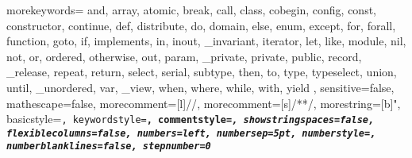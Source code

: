   {
    morekeywords={
      and, array, atomic,
      break,
      call, class, cobegin, config, const, constructor, continue,
      def, distribute, do, domain,
      else, enum, except,
      for, forall, function,
      goto,
      if, implements, in, inout, _invariant, iterator,
      let, like,
      module,
      nil, not,
      or, ordered, otherwise, out,
      param, _private, private, public,
      record, _release, repeat, return,
      select, serial, subtype,
      then, to, type, typeselect,
      union, until, _unordered,
      var, _view,
      when, where, while, with,
      yield
    },
    sensitive=false,
    mathescape=false,
    morecomment=[l]{//},
    morecomment=[s]{/*}{*/},
    morestring=[b]",
    basicstyle=\footnotesize\tt,
    keywordstyle=\bf,
    commentstyle=\em,
    showstringspaces=false,
    flexiblecolumns=false,
    numbers=left,
    numbersep=5pt,
    numberstyle=\tiny,
    numberblanklines=false,
    stepnumber=0
  }

\newcommand{\chpl}[1]{\lstinline[language=chapel,basicstyle=\normalsize\tt,keywordstyle=]!#1!}

